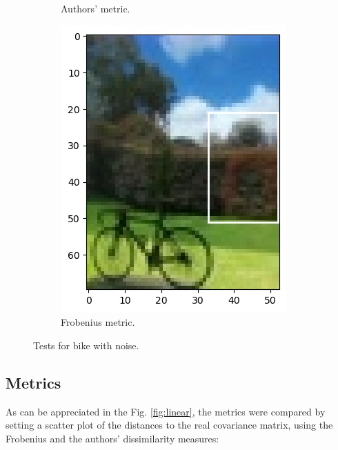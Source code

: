 \documentclass[11pt]{article}
\theoremstyle{definition}
\theoremstyle{remark}
\theoremstyle{remark}
\theoremstyle{remark}
\begin{document}
\begin{figure}[H]
\begin{subfigure}[b]{0.32\textwidth}
    \caption{Authors' metric.}
  \end{subfigure}
  \begin{subfigure}[b]{0.32\textwidth}
    \centering \includegraphics[width=\textwidth]{figs/0-4-1-test_case1.jpg}
    \caption{Frobenius metric.}
  \end{subfigure}
  \caption{Tests for bike with noise.}
  \label{fig:test_bike_lw}
\end{figure}

\subsection{Metrics}
As can be appreciated in the Fig. \ref{fig:linear}, the metrics were compared by
setting a scatter plot of the distances to the real covariance matrix, using the
Frobenius and the authors' dissimilarity measures:
\end{document}
